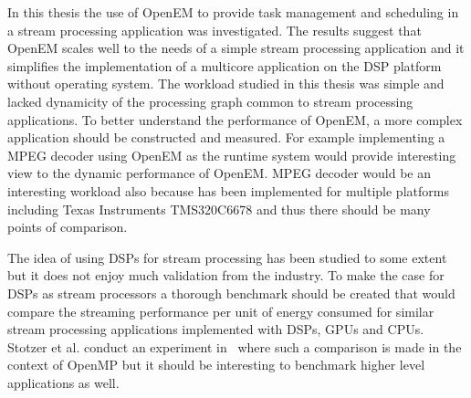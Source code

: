 In this thesis the use of OpenEM to provide task management and scheduling in a stream processing application was investigated. The results suggest that OpenEM scales well to the needs of a simple stream processing application and it simplifies the implementation of a multicore application on the DSP platform without operating system. The workload studied in this thesis was simple and lacked dynamicity of the processing graph common to stream processing applications. To better understand the performance of OpenEM, a more complex application should be constructed and measured. For example implementing a MPEG decoder using OpenEM as the runtime system would provide interesting view to the dynamic performance of OpenEM. MPEG decoder would be an interesting workload also because has been implemented for multiple platforms including Texas Instruments TMS320C6678 and thus there should be many points of comparison.

The idea of using DSPs for stream processing has been studied to some extent but it does not enjoy much validation from the industry. To make the case for DSPs as stream processors a thorough benchmark should be created that would compare the streaming performance per unit of energy consumed for similar stream processing applications implemented with DSPs, GPUs and CPUs. Stotzer et al. conduct an experiment in~\cite{stotzer2013openmp} where such a comparison is made in the context of OpenMP but it should be interesting to benchmark higher level applications as well.
